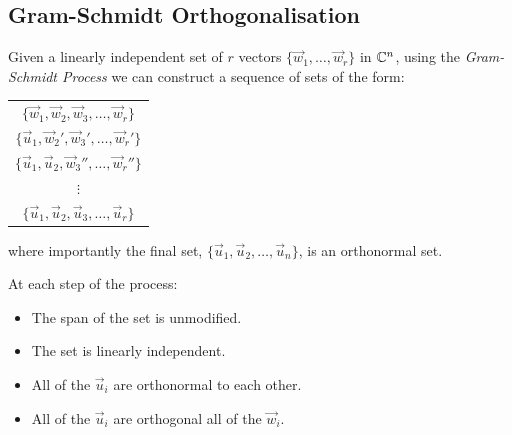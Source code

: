 \documentclass[../main.tex]{subfiles}
\begin{document}
\subsection{Gram-Schmidt Orthogonalisation}
\label{gramSchmidt}
Given a linearly independent set of $r$ vectors $\{\vec{w}_1, \ldots, \vec{w}_r\}$ in $\mathbb{C}^{n}$, using the \textit{Gram-Schmidt Process} we can construct a sequence of sets of the form:
\begin{center}
\begin{tabular}{c}
$\{\vec{w}_1, \vec{w}_2, \vec{w}_3, \ldots, \vec{w}_r\} $ \\
$\{\vec{u}_1, \vec{w}_2', \vec{w}_3', \ldots, \vec{w}_r'\} $ \\
$\{\vec{u}_1, \vec{u}_2, \vec{w}_3'', \ldots, \vec{w}_r''\} $ \\
$\vdots$ \\
$\{\vec{u}_1, \vec{u}_2, \vec{u}_3,\ldots, \vec{u}_r\} $ \\
\end{tabular}
\end{center}
where importantly the final set, $\{\vec{u}_1, \vec{u}_2, \ldots, \vec{u}_n\}$, is an orthonormal set.

At each step of the process:
\begin{itemize}
  \item The span of the set is unmodified.
  \item The set is linearly independent.
  \item All of the $\vec{u}_i$ are orthonormal to each other.
  \item All of the $\vec{u}_i$ are orthogonal all of the $\vec{w}_i$.
\end{itemize}
\end{document}

